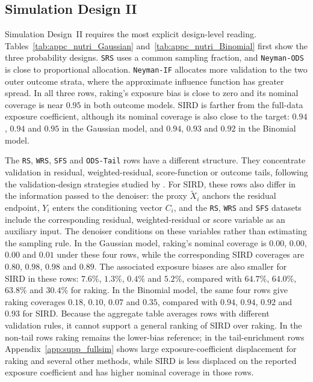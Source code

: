 \subsection{Simulation Design II}
\label{sec:sird_sim_nutri}

Simulation Design~II requires the most explicit design-level reading. Tables~\ref{tab:appc_nutri_Gaussian} and~\ref{tab:appc_nutri_Binomial} first show the three probability designs. \texttt{SRS} uses a common sampling fraction, and \texttt{Neyman-ODS} is close to proportional allocation. \texttt{Neyman-IF} allocates more validation to the two outer outcome strata, where the approximate influence function has greater spread. In all three rows, raking's exposure bias is close to zero and its nominal coverage is near \(0.95\) in both outcome models. SIRD is farther from the full-data exposure coefficient, although its nominal coverage is also close to the target: \(0.94\), \(0.94\) and \(0.95\) in the Gaussian model, and \(0.94\), \(0.93\) and \(0.92\) in the Binomial model.

The \texttt{RS}, \texttt{WRS}, \texttt{SFS} and \texttt{ODS-Tail} rows have a different structure. They concentrate validation in residual, weighted-residual, score-function or outcome tails, following the validation-design strategies studied by \citet{amorim2021two}. For SIRD, these rows also differ in the information passed to the denoiser: the proxy \(\tilde X_i\) anchors the residual endpoint, \(Y_i\) enters the conditioning vector \(C_i\), and the \texttt{RS}, \texttt{WRS} and \texttt{SFS} datasets include the corresponding residual, weighted-residual or score variable as an auxiliary input. The denoiser conditions on these variables rather than estimating the sampling rule. In the Gaussian model, raking's nominal coverage is \(0.00\), \(0.00\), \(0.00\) and \(0.01\) under these four rows, while the corresponding SIRD coverages are \(0.80\), \(0.98\), \(0.98\) and \(0.89\). The associated exposure biases are also smaller for SIRD in these rows: \(7.6\%\), \(1.3\%\), \(0.4\%\) and \(5.2\%\), compared with \(64.7\%\), \(64.0\%\), \(63.8\%\) and \(30.4\%\) for raking. In the Binomial model, the same four rows give raking coverages \(0.18\), \(0.10\), \(0.07\) and \(0.35\), compared with \(0.94\), \(0.94\), \(0.92\) and \(0.93\) for SIRD. Because the aggregate table averages rows with different validation rules, it cannot support a general ranking of SIRD over raking. In the non-tail rows raking remains the lower-bias reference; in the tail-enrichment rows Appendix~\ref{app:supp_fullsim} shows large exposure-coefficient displacement for raking and several other methods, while SIRD is less displaced on the reported exposure coefficient and has higher nominal coverage in those rows.

